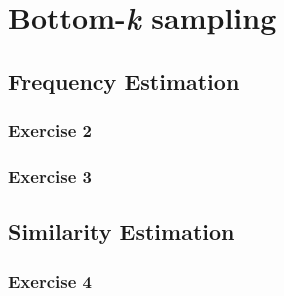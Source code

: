 \section{Bottom-\textit{k} sampling}
\subsection{Frequency Estimation}
\subsubsection{Exercise 2}
\subsubsection{Exercise 3}
\subsection{Similarity Estimation}
\subsubsection{Exercise 4}
